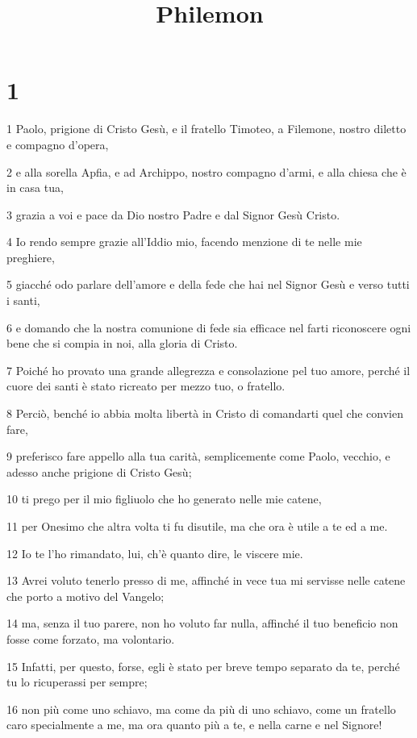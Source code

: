 

\title{Philemon}


\chapter{1}

\par 1 Paolo, prigione di Cristo Gesù, e il fratello Timoteo, a Filemone, nostro diletto e compagno d'opera,
\par 2 e alla sorella Apfia, e ad Archippo, nostro compagno d'armi, e alla chiesa che è in casa tua,
\par 3 grazia a voi e pace da Dio nostro Padre e dal Signor Gesù Cristo.
\par 4 Io rendo sempre grazie all'Iddio mio, facendo menzione di te nelle mie preghiere,
\par 5 giacché odo parlare dell'amore e della fede che hai nel Signor Gesù e verso tutti i santi,
\par 6 e domando che la nostra comunione di fede sia efficace nel farti riconoscere ogni bene che si compia in noi, alla gloria di Cristo.
\par 7 Poiché ho provato una grande allegrezza e consolazione pel tuo amore, perché il cuore dei santi è stato ricreato per mezzo tuo, o fratello.
\par 8 Perciò, benché io abbia molta libertà in Cristo di comandarti quel che convien fare,
\par 9 preferisco fare appello alla tua carità, semplicemente come Paolo, vecchio, e adesso anche prigione di Cristo Gesù;
\par 10 ti prego per il mio figliuolo che ho generato nelle mie catene,
\par 11 per Onesimo che altra volta ti fu disutile, ma che ora è utile a te ed a me.
\par 12 Io te l'ho rimandato, lui, ch'è quanto dire, le viscere mie.
\par 13 Avrei voluto tenerlo presso di me, affinché in vece tua mi servisse nelle catene che porto a motivo del Vangelo;
\par 14 ma, senza il tuo parere, non ho voluto far nulla, affinché il tuo beneficio non fosse come forzato, ma volontario.
\par 15 Infatti, per questo, forse, egli è stato per breve tempo separato da te, perché tu lo ricuperassi per sempre;
\par 16 non più come uno schiavo, ma come da più di uno schiavo, come un fratello caro specialmente a me, ma ora quanto più a te, e nella carne e nel Signore!
